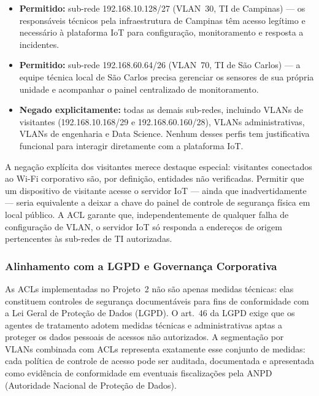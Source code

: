 \begin{itemize}
    \item \textbf{Permitido:} sub-rede 192.168.10.128/27 (VLAN~30, TI de Campinas)
    — os responsáveis técnicos pela infraestrutura de Campinas têm acesso legítimo
    e necessário à plataforma IoT para configuração, monitoramento e resposta a
    incidentes.
    \item \textbf{Permitido:} sub-rede 192.168.60.64/26 (VLAN~70, TI de São Carlos)
    — a equipe técnica local de São Carlos precisa gerenciar os sensores de sua
    própria unidade e acompanhar o painel centralizado de monitoramento.
    \item \textbf{Negado explicitamente:} todas as demais sub-redes, incluindo
    VLANs de visitantes (192.168.10.168/29 e 192.168.60.160/28), VLANs
    administrativas, VLANs de engenharia e Data Science. Nenhum desses perfis
    tem justificativa funcional para interagir diretamente com a plataforma IoT.
\end{itemize}

A negação explícita dos visitantes merece destaque especial: visitantes conectados
ao Wi-Fi corporativo são, por definição, entidades não verificadas. Permitir que
um dispositivo de visitante acesse o servidor IoT — ainda que inadvertidamente —
seria equivalente a deixar a chave do painel de controle de segurança física em
local público. A ACL garante que, independentemente de qualquer falha de
configuração de VLAN, o servidor IoT só responda a endereços de origem pertencentes
às sub-redes de TI autorizadas.

\subsubsection{Alinhamento com a LGPD e Governança Corporativa}

As ACLs implementadas no Projeto~2 não são apenas medidas técnicas: elas constituem
controles de segurança documentáveis para fins de conformidade com a Lei Geral de
Proteção de Dados (LGPD). O art.~46 da LGPD exige que os agentes de tratamento
adotem medidas técnicas e administrativas aptas a proteger os dados pessoais de
acessos não autorizados. A segmentação por VLANs combinada com ACLs representa
exatamente esse conjunto de medidas: cada política de controle de acesso pode ser
auditada, documentada e apresentada como evidência de conformidade em eventuais
fiscalizações pela ANPD (Autoridade Nacional de Proteção de Dados).

